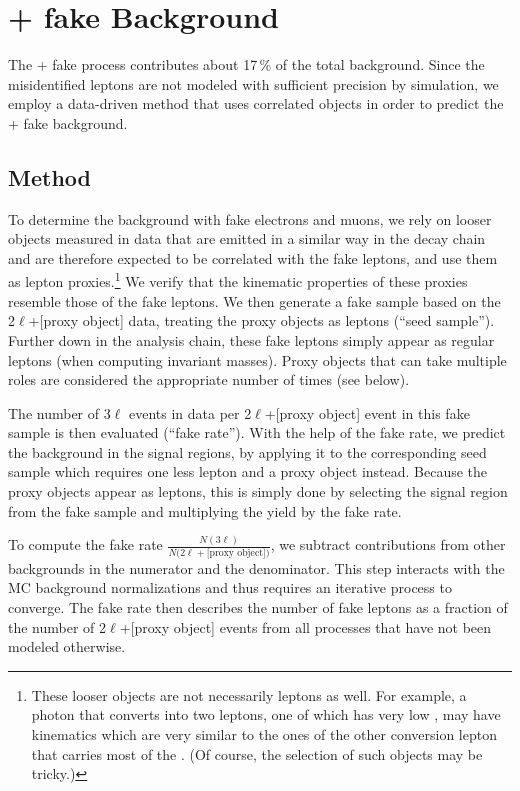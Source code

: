 \section{\texorpdfstring{\Z}{Z} + fake Background}
\label{sec:bkg_fakeLight}

The \Z + fake process contributes about 17\,\% of the total background. Since the misidentified leptons are not modeled with sufficient precision by simulation, we employ a data-driven method that uses correlated objects in order to predict the \Z + fake background.


\subsection{Method}
\label{sec:bkg_fakeLight/Method}

To determine the background with fake electrons and muons, we rely on looser objects measured in data that are emitted in a similar way in the decay chain and are therefore expected to be correlated with the fake leptons, and use them as lepton proxies.\footnote{These looser objects are not necessarily leptons as well. For example, a photon that converts into two leptons, one of which has very low \pt, may have kinematics which are very similar to the ones of the other conversion lepton that carries most of the \pt. (Of course, the selection of such objects may be tricky.)} We verify that the kinematic properties of these proxies resemble those of the fake leptons. We then generate a fake sample based on the 2$\ell$+[proxy object] data, treating the proxy objects as leptons (``seed sample''). Further down in the analysis chain, these fake leptons simply appear as regular leptons (\eg when computing invariant masses). Proxy objects that can take multiple roles are considered the appropriate number of times (see below).

The number of 3$\ell$ events in data per 2$\ell$+[proxy object] event in this fake sample is then evaluated (``fake rate''). With the help of the fake rate, we predict the background in the signal regions, by applying it to the corresponding seed sample which requires one less lepton and a proxy object instead. Because the proxy objects appear as leptons, this is simply done by selecting the signal region from the fake sample and multiplying the yield by the fake rate.

To compute the fake rate $\frac{N(3\ell)}{N(2\ell + \textrm{[proxy object])}}$, we subtract contributions from other backgrounds in the numerator and the denominator. This step interacts with the MC background normalizations and thus requires an iterative process to converge. The fake rate then describes the number of fake leptons as a fraction of the number of 2$\ell$+[proxy object] events from all processes that have not been modeled otherwise.

